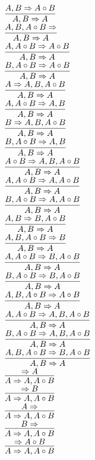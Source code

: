 \documentclass[11pt]{article}
\begin{document}
\begin{center}
\bigskip
\\$\infer{A, B\Rightarrow A}{A, B\Rightarrow A\circ B}$
\bigskip
\\$\infer{A, B\Rightarrow A}{A, B, A\circ B\Rightarrow }$
\bigskip
\\$\infer{A, B\Rightarrow A}{A, A\circ B\Rightarrow A\circ B}$
\bigskip
\\$\infer{A, B\Rightarrow A}{B, A\circ B\Rightarrow A\circ B}$
\bigskip
\\$\infer{A, B\Rightarrow A}{A\Rightarrow A, B, A\circ B}$
\bigskip
\\$\infer{A, B\Rightarrow A}{A, A\circ B\Rightarrow A, B}$
\bigskip
\\$\infer{A, B\Rightarrow A}{B\Rightarrow A, B, A\circ B}$
\bigskip
\\$\infer{A, B\Rightarrow A}{B, A\circ B\Rightarrow A, B}$
\bigskip
\\$\infer{A, B\Rightarrow A}{A\circ B\Rightarrow A, B, A\circ B}$
\bigskip
\\$\infer{A, B\Rightarrow A}{A, A\circ B\Rightarrow A, A\circ B}$
\bigskip
\\$\infer{A, B\Rightarrow A}{B, A\circ B\Rightarrow A, A\circ B}$
\bigskip
\\$\infer{A, B\Rightarrow A}{A, B\Rightarrow B, A\circ B}$
\bigskip
\\$\infer{A, B\Rightarrow A}{A, B, A\circ B\Rightarrow B}$
\bigskip
\\$\infer{A, B\Rightarrow A}{A, A\circ B\Rightarrow B, A\circ B}$
\bigskip
\\$\infer{A, B\Rightarrow A}{B, A\circ B\Rightarrow B, A\circ B}$
\bigskip
\\$\infer{A, B\Rightarrow A}{A, B, A\circ B\Rightarrow A\circ B}$
\bigskip
\\$\infer{A, B\Rightarrow A}{A, A\circ B\Rightarrow A, B, A\circ B}$
\bigskip
\\$\infer{A, B\Rightarrow A}{B, A\circ B\Rightarrow A, B, A\circ B}$
\bigskip
\\$\infer{A, B\Rightarrow A}{A, B, A\circ B\Rightarrow B, A\circ B}$
\bigskip
\\$\infer{A\Rightarrow A, A\circ B}{\Rightarrow A}$
\bigskip
\\$\infer{A\Rightarrow A, A\circ B}{\Rightarrow B}$
\bigskip
\\$\infer{A\Rightarrow A, A\circ B}{A\Rightarrow }$
\bigskip
\\$\infer{A\Rightarrow A, A\circ B}{B\Rightarrow }$
\bigskip
\\$\infer{A\Rightarrow A, A\circ B}{\Rightarrow A\circ B}$

\end{center}
\end{document}
